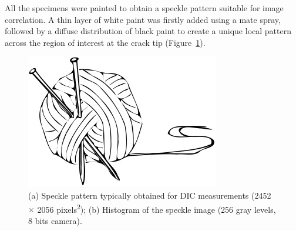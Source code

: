 \documentclass[3p,times,procedia]{elsarticle}
\begin{document}
All the specimens were painted to obtain a speckle pattern suitable for image correlation. A thin layer of white paint was firstly added using a mate spray, followed by a diffuse distribution of black paint to create a unique local pattern across the region of interest at the crack tip (Figure~\ref{fig:Fig17}).

\begin{figure}[t]
	\centering
	\includegraphics[width=.9\textwidth]{Figures/example}
	\caption{(a) Speckle pattern typically obtained for DIC measurements (2452 $\times$ 2056
		pixels\textsuperscript{2}); (b) Histogram
		of the
		speckle image
		(256
		gray levels, 8 bits camera).}
	\label{fig:Fig17}
\end{figure}
\end{document}
